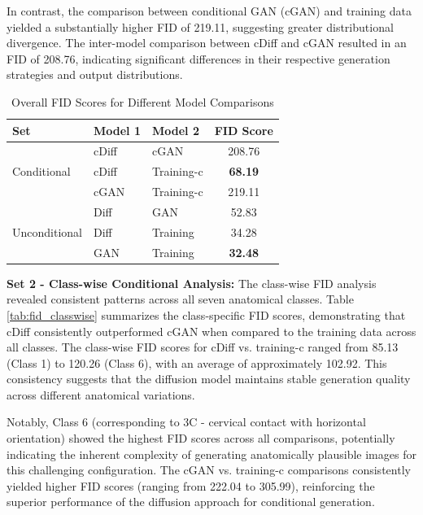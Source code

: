 In contrast, the comparison between conditional GAN (cGAN) and training data yielded a substantially higher FID of 219.11, suggesting greater distributional divergence. The inter-model comparison between cDiff and cGAN resulted in an FID of 208.76, indicating significant differences in their respective generation strategies and output distributions.

\begin{table}[htbp]
\centering
\caption{Overall FID Scores for Different Model Comparisons}
\label{tab:fid_overall}
\begin{tabular}{|l|l|l|c|}
\hline
\textbf{Set} & \textbf{Model 1} & \textbf{Model 2} & \textbf{FID Score} \\
\hline
\multirow{3}{*}{Conditional} & cDiff & cGAN & 208.76 \\
& cDiff & Training-c & \textbf{68.19} \\
& cGAN & Training-c & 219.11 \\
\hline
\multirow{3}{*}{Unconditional} & Diff & GAN & 52.83 \\
& Diff & Training & 34.28 \\
& GAN & Training & \textbf{32.48} \\
\hline
\end{tabular}
\end{table}

\textbf{Set 2 - Class-wise Conditional Analysis:} The class-wise FID analysis revealed consistent patterns across all seven anatomical classes. Table \ref{tab:fid_classwise} summarizes the class-specific FID scores, demonstrating that cDiff consistently outperformed cGAN when compared to the training data across all classes. The class-wise FID scores for cDiff vs. training-c ranged from 85.13 (Class 1) to 120.26 (Class 6), with an average of approximately 102.92. This consistency suggests that the diffusion model maintains stable generation quality across different anatomical variations.

Notably, Class 6 (corresponding to 3C - cervical contact with horizontal orientation) showed the highest FID scores across all comparisons, potentially indicating the inherent complexity of generating anatomically plausible images for this challenging configuration. The cGAN vs. training-c comparisons consistently yielded higher FID scores (ranging from 222.04 to 305.99), reinforcing the superior performance of the diffusion approach for conditional generation.

